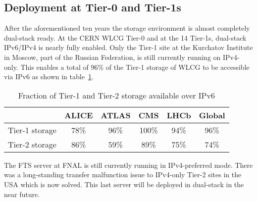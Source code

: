 
%
\subsection{Deployment at Tier-0 and Tier-1s}
After the aforementioned ten years the storage environment is almost completely dual-stack ready. At the CERN WLCG Tier-0 and at the 14 Tier-1s, dual-stack IPv6/IPv4 is nearly fully enabled. Only the Tier-1 site at the Kurchatov Institute in Moscow, part of the Russian Federation, is still currently running on IPv4-only. This enables a total of 96\% of the Tier-1 storage of WLCG to be accessible via IPv6 as shown in table~\ref{tab:t012stor}.
\begin{table}[h]
\centering
\caption{Fraction of Tier-1 and Tier-2 storage available over IPv6}
\label{tab:t012stor}
\begin{tabular}{lccccc}
\hline
& ALICE & ATLAS & CMS & LHCb & Global \\\hline
Tier-1 storage & 78\% & 96\% & 100\% & 94\% & 96\% \\
Tier-2 storage & 86\% & 59\% &  89\% & 75\% & 74\% \\\hline
\end{tabular}
\end{table}

The FTS server at FNAL is still currently running in IPv4-preferred mode. There was a long-standing transfer malfunction issue to IPv4-only Tier-2 sites in the USA which is now solved. This last server will be deployed in dual-stack in the near future.
